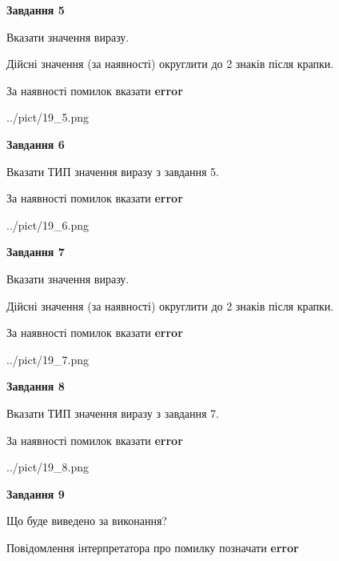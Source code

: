 \documentclass[11pt, ukrainian]{article}
\begin{document}
{\begin {large}
{\begin {center}\textbf{Завдання 5}\end {center}}\par
Вказати значення виразу. \par
Дійсні значення (за наявності) округлити до 2 знаків після крапки. \par
За наявності помилок вказати \textbf{error}

\begin{center}
	{../pict/19_5.png}
\end{center}
\newpage

{\begin {center}\textbf{Завдання 6}\end {center}}\par
Вказати ТИП значення виразу з завдання 5. \par
За наявності помилок вказати \textbf{error}

\begin{center}
	{../pict/19_6.png}
\end{center}
\newpage

{\begin {center}\textbf{Завдання 7}\end {center}}\par
Вказати значення виразу. \par
Дійсні значення (за наявності) округлити до 2 знаків після крапки. \par
За наявності помилок вказати \textbf{error}

\begin{center}
	{../pict/19_7.png}
\end{center}
\newpage

{\begin {center}\textbf{Завдання 8}\end {center}}\par
Вказати ТИП значення виразу з завдання 7. \par
За наявності помилок вказати \textbf{error}

\begin{center}
	{../pict/19_8.png}
\end{center}
\newpage

{\begin {center}\textbf{Завдання 9}\end {center}}\par
Що буде виведено за виконання? \par
Повідомлення інтерпретатора про помилку позначати \textbf{error}


\end{large}}
\end{document}
